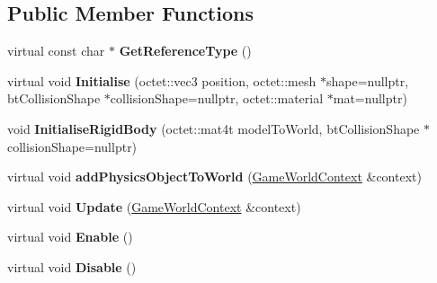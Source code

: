\subsection*{Public Member Functions}
\begin{DoxyCompactItemize}
\item 
\hypertarget{class_arena_1_1_physics_object_af0cdd9b1d59e30eba7101916e4de2c52}{virtual const char $\ast$ {\bfseries Get\+Reference\+Type} ()}\label{class_arena_1_1_physics_object_af0cdd9b1d59e30eba7101916e4de2c52}

\item 
\hypertarget{class_arena_1_1_physics_object_a1c047cab77a4d7f8555c3f1bed3cea86}{virtual void {\bfseries Initialise} (octet\+::vec3 position, octet\+::mesh $\ast$shape=nullptr, bt\+Collision\+Shape $\ast$collision\+Shape=nullptr, octet\+::material $\ast$mat=nullptr)}\label{class_arena_1_1_physics_object_a1c047cab77a4d7f8555c3f1bed3cea86}

\item 
\hypertarget{class_arena_1_1_physics_object_a9e10bdfe72672967777e52ca51d5682a}{void {\bfseries Initialise\+Rigid\+Body} (octet\+::mat4t model\+To\+World, bt\+Collision\+Shape $\ast$collision\+Shape=nullptr)}\label{class_arena_1_1_physics_object_a9e10bdfe72672967777e52ca51d5682a}

\item 
\hypertarget{class_arena_1_1_physics_object_a34ee0dacb9dff05dde46fbf99672f40c}{virtual void {\bfseries add\+Physics\+Object\+To\+World} (\hyperlink{struct_arena_1_1_game_world_context}{Game\+World\+Context} \&context)}\label{class_arena_1_1_physics_object_a34ee0dacb9dff05dde46fbf99672f40c}

\item 
\hypertarget{class_arena_1_1_physics_object_a3efbef8665fee4e50cc19d5202292eee}{virtual void {\bfseries Update} (\hyperlink{struct_arena_1_1_game_world_context}{Game\+World\+Context} \&context)}\label{class_arena_1_1_physics_object_a3efbef8665fee4e50cc19d5202292eee}

\item 
\hypertarget{class_arena_1_1_physics_object_a0d10de17213299177cd2b10499d9f038}{virtual void {\bfseries Enable} ()}\label{class_arena_1_1_physics_object_a0d10de17213299177cd2b10499d9f038}

\item 
\hypertarget{class_arena_1_1_physics_object_a2fa9893c955d2332d67108fbaa7f308e}{virtual void {\bfseries Disable} ()}\label{class_arena_1_1_physics_object_a2fa9893c955d2332d67108fbaa7f308e}


\end{DoxyCompactItemize}
